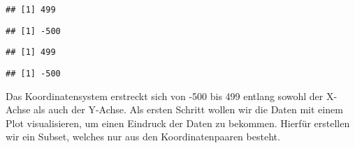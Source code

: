 \documentclass[
]{article}
\newenvironment{Shaded}{\begin{snugshade}}{\end{snugshade}}
\newcommand{\AttributeTok}[1]{\textcolor[rgb]{0.13,0.29,0.53}{#1}}
\newcommand{\CommentTok}[1]{\textcolor[rgb]{0.56,0.35,0.01}{\textit{#1}}}
\newcommand{\FunctionTok}[1]{\textcolor[rgb]{0.13,0.29,0.53}{\textbf{#1}}}
\newcommand{\NormalTok}[1]{#1}
\newcommand{\OtherTok}[1]{\textcolor[rgb]{0.56,0.35,0.01}{#1}}
\newcommand{\SpecialCharTok}[1]{\textcolor[rgb]{0.81,0.36,0.00}{\textbf{#1}}}
\newcommand{\StringTok}[1]{\textcolor[rgb]{0.31,0.60,0.02}{#1}}
\begin{document}
\begin{verbatim}
## [1] 499
\end{verbatim}

\begin{Shaded}
\end{Shaded}

\begin{verbatim}
## [1] -500
\end{verbatim}

\begin{Shaded}
\end{Shaded}

\begin{verbatim}
## [1] 499
\end{verbatim}

\begin{Shaded}
\end{Shaded}

\begin{verbatim}
## [1] -500
\end{verbatim}

Das Koordinatensystem erstreckt sich von -500 bis 499 entlang sowohl der
X-Achse als auch der Y-Achse. Als ersten Schritt wollen wir die Daten
mit einem Plot visualisieren, um einen Eindruck der Daten zu bekommen.
Hierfür erstellen wir ein Subset, welches nur aus den Koordinatenpaaren
besteht.

\begin{Shaded}
\end{Shaded}
\end{document}
